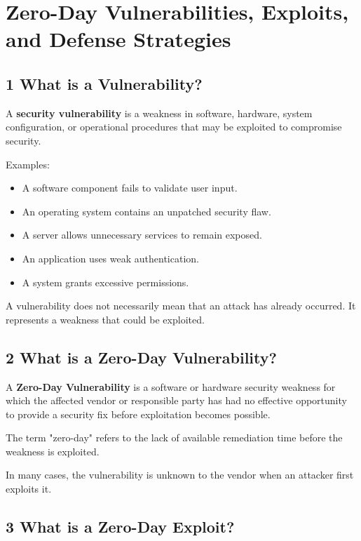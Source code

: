 \section{Zero-Day Vulnerabilities, Exploits, and Defense Strategies}


\subsection{1 What is a Vulnerability?}

A \textbf{security vulnerability} is a weakness in software, hardware, system configuration, or operational procedures that may be exploited to compromise security.

Examples:

\begin{itemize}
\item A software component fails to validate user input.
\item An operating system contains an unpatched security flaw.
\item A server allows unnecessary services to remain exposed.
\item An application uses weak authentication.
\item A system grants excessive permissions.
\end{itemize}

A vulnerability does not necessarily mean that an attack has already occurred. It represents a weakness that could be exploited.

\subsection{2 What is a Zero-Day Vulnerability?}

A \textbf{Zero-Day Vulnerability} is a software or hardware security weakness for which the affected vendor or responsible party has had no effective opportunity to provide a security fix before exploitation becomes possible.

The term "zero-day" refers to the lack of available remediation time before the weakness is exploited.

In many cases, the vulnerability is unknown to the vendor when an attacker first exploits it.

\subsection{3 What is a Zero-Day Exploit?}

